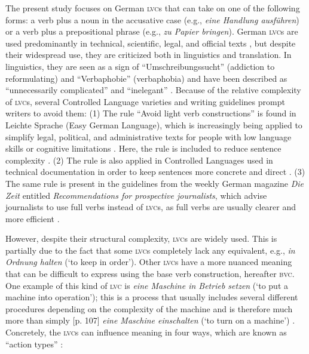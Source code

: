 \documentclass[output=paper]{langsci/langscibook}
\begin{document}
The present study focuses on German \textsc{lvc}s that can take on one of the following forms: a verb plus a noun in the accusative case (e.g., \textit{eine Handlung ausführen}) or a verb plus a prepositional phrase (e.g., \textit{zu Papier bringen}). German \textsc{lvc}s are used predominantly in technical, scientific, legal, and official texts \citep[38f.]{Bruker2013}, but despite their widespread use, they are criticized both in linguistics and translation. In linguistics, they are seen as a sign of “Umschreibungssucht” (addiction to reformulating) and “Verbaphobie” (verbaphobia) \citep[9f.]{Daniels1963} and have been described as “unnecessarily complicated” and “inelegant” \citep{Storrer2006a}. Because of the relative complexity of \textsc{lvc}s, several Controlled Language varieties and writing guidelines prompt writers to avoid them: (1) The rule “Avoid light verb constructions” is found in Leichte Sprache (Easy German Language), which is increasingly being applied to simplify legal, political, and administrative texts for people with low language skills or cognitive limitations \citep{Hansen-Schirra2018}. Here, the rule is included to reduce sentence complexity \citep{ubhd-67957969}. (2) The rule is also applied in Controlled Languages used in technical documentation in order to keep sentences more concrete and direct \citep[107]{GesellschaftfurTechnischeKommunikation2013}. (3) The same rule is present in the guidelines from the weekly German magazine \textit{Die Zeit} entitled \textit{Recommendations for prospective journalists}, which advise journalists to use full verbs instead of \textsc{lvc}s, as full verbs are usually clearer and more efficient \citep{Zeit2007}.

However, despite their structural complexity, \textsc{lvc}s are widely used. This is partially due to the fact that some \textsc{lvc}s completely lack any equivalent, e.g., \textit{in Ordnung halten} (`to keep in order'). Other \textsc{lvc}s have a more nuanced meaning that can be difficult to express using the base verb construction, hereafter \textsc{bvc}. One example of this kind of \textsc{lvc} is \textit{eine Maschine in Betrieb setzen} (`to put a machine into operation'); this is a process that usually includes several different procedures depending on the complexity of the machine and is therefore much more than simply [p. 107] \textit{eine Maschine einschalten} (`to turn on a machine') \citep{ubhd-67954849}. Concretely, the \textsc{lvc}s can influence meaning in four ways, which are known as “action types” \citep*[704]{Zifonun1997}:
\end{document}
